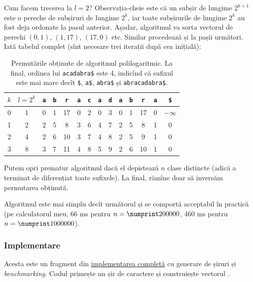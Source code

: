 \documentclass[../main.tex]{subfiles}
\begin{document}
Cum facem trecerea la $l = 2$? Observația-cheie este că un subșir de lungime $2^{k + 1}$ este o pereche de subșiruri de lungime $2^k$, iar toate subșirurile de lungime $2^k$ au fost deja ordonate la pasul anterior. Așadar, algoritmul va sorta vectorul de perechi $(0, 1)$, $(1, 17)$, $(17, 0)$ etc. Similar procedează și la pașii următori. Iată tabelul complet (sînt necesare trei iterații după cea inițială):

\begin{table}[H]
  \centering
  \begin{tabular}{c|c|cccccccccccc}
    \textbf{$k$} & \textbf{$l = 2^k$} & \texttt{a} & \texttt{b} & \texttt{r} & \texttt{a} & \texttt{c} & \texttt{a} & \texttt{d} & \texttt{a} & \texttt{b} & \texttt{r} & \texttt{a} & \texttt{\$} \\
    \hline
    0 & 1 & 0 & 1 & 17 & 0 & 2 & 0 & 3 & 0 & 1 & 17 & 0 & $-\infty$ \\
    1 & 2 & 2 & 5 & 8 & 3 & 6 & 4 & 7 & 2 & 5 & 8 & 1 & 0 \\
    2 & 4 & 2 & 6 & 10 & 3 & 7 & 4 & 8 & 2 & 5 & 9 & 1 & 0 \\
    3 & 8 & 3 & 7 & 11 & 4 & 8 & 5 & 9 & 2 & 6 & 10 & 1 & 0 \\
  \end{tabular}
  \caption{Permutările obținute de algoritmul polilogaritmic. La final, ordinea lui \texttt{acadabra\$} este 4, indicînd că sufixul este mai mare decît \texttt{\$}, \texttt{a\$}, \texttt{abra\$} și \texttt{abracadabra\$}.}
\end{table}

Putem opri prematur algoritmul dacă el depistează $n$ clase distincte (adică a terminat de diferențiat toate sufixele). La final, rămîne doar să inversăm permutarea obținută.

Algoritmul este mai simplu decît următorul și se comportă acceptabil în practică (pe calculatorul meu, 66 ms pentru $n = \np{200000}$, 460 ms pentru $n = \np{1000000}$).

\subsubsection*{Implementare}

Acesta este un fragment din \href{https://github.com/CatalinFrancu/nerdvana/blob/main/strings/suffix-arrays/prefix-doubling.cpp}{implementarea completă} cu generare de șiruri și \textit{benchmarking}. Codul primește un șir  de  caractere și construiește vectorul .
\end{document}
